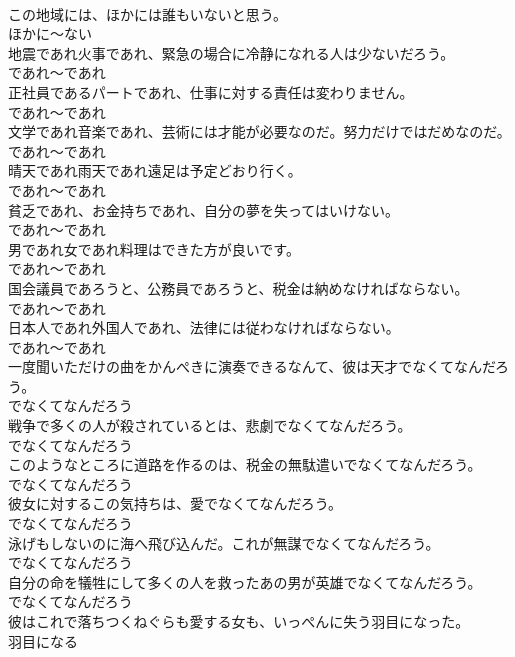 \documentclass[8pt]{extreport}
\begin{document}
\begin{CJK}{UTF8}{min}
\\	この地域には、ほかには誰もいないと思う。	
\\	ほかに～ない	
\\	地震であれ火事であれ、緊急の場合に冷静になれる人は少ないだろう。	
\\	であれ～であれ	
\\	正社員であるパートであれ、仕事に対する責任は変わりません。	
\\	であれ～であれ	
\\	文学であれ音楽であれ、芸術には才能が必要なのだ。努力だけではだめなのだ。	
\\	であれ～であれ	
\\	晴天であれ雨天であれ遠足は予定どおり行く。	
\\	であれ～であれ	
\\	貧乏であれ、お金持ちであれ、自分の夢を失ってはいけない。	
\\	であれ～であれ	
\\	男であれ女であれ料理はできた方が良いです。	
\\	であれ～であれ	
\\	国会議員であろうと、公務員であろうと、税金は納めなければならない。	
\\	であれ～であれ	
\\	日本人であれ外国人であれ、法律には従わなければならない。	
\\	であれ～であれ	
\\	一度聞いただけの曲をかんぺきに演奏できるなんて、彼は天才でなくてなんだろう。	
\\	でなくてなんだろう	
\\	戦争で多くの人が殺されているとは、悲劇でなくてなんだろう。	
\\	でなくてなんだろう	
\\	このようなところに道路を作るのは、税金の無駄遣いでなくてなんだろう。	
\\	でなくてなんだろう	
\\	彼女に対するこの気持ちは、愛でなくてなんだろう。	
\\	でなくてなんだろう	
\\	泳げもしないのに海へ飛び込んだ。これが無謀でなくてなんだろう。	
\\	でなくてなんだろう	
\\	自分の命を犠牲にして多くの人を救ったあの男が英雄でなくてなんだろう。	
\\	でなくてなんだろう	
\\	彼はこれで落ちつくねぐらも愛する女も、いっぺんに失う羽目になった。	
\\	羽目になる	

\end{CJK}
\end{document}
